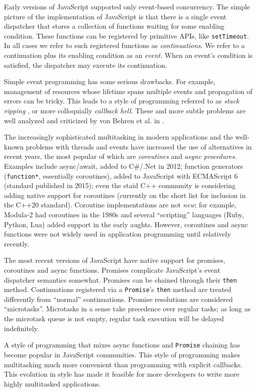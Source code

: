 \documentclass[acmsmall,anonymous,review]{acmart}\settopmatter{printfolios=true,printccs=false,printacmref=false}
\begin{document}
Early versions of JavaScript supported only event-based concurrency.
The simple picture of the implementation of JavaScript is that there is a single event dispatcher that stores a collection of functions waiting for some enabling condition.
These functions can be registered by primitive APIs, like \texttt{setTimeout}.
In all cases we refer to such registered functions as \emph{continuations}.
We refer to a continuation plus its enabling condition as an \emph{event}.
When an event's condition is satisfied, the dispatcher may execute its continuation.

Simple event programming has some serious drawbacks.
For example, management of resources whose lifetime spans multiple events and propagation of errors can be tricky.
This leads to a style of programming referred to as \emph{stack ripping} \cite{Adya2002}, or more colloquially \emph{callback hell}.
These and more subtle problems are well analyzed and criticized by von Behren et al. in \cite{Behren2003a}.

The increasingly sophisticated multitasking in modern applications and the well-known problems with threads and events have increased the use of alternatives in recent years, the most popular of which are \emph{coroutines} and \emph{async procedures}.
Examples include async/await, added to C\#/.Net in 2012; function generators (\texttt{function*}, essentially coroutines), added to JavaScript with ECMAScript 6 (standard published in 2015); even the staid C++ community is considering adding native support for coroutines (currently on the short list for inclusion in the C++20 standard).
Coroutine implementations are not \emph{new}; for example, Modula-2 had coroutines in the 1980s and several ``scripting'' languages (Ruby, Python, Lua) added support in the early aughts.
However, coroutines and async functions were not widely used in application programming until relatively recently.

The most recent versions of JavaScript have native support for promises, coroutines and async functions.
Promises complicate JavaScript's event dispatcher semantics somewhat.
Promises can be chained through their \texttt{then} method.
Continuations registered via a \texttt{Promise}'s \texttt{then} method are treated differently from ``normal'' continuations.
Promise resolutions are considered ``microtasks''.
Microtasks in a sense take precedence over regular tasks; as long as the microtask queue is not empty, regular task execution will be delayed indefinitely.

A style of programming that mixes async functions and \texttt{Promise} chaining has become popular in JavaScript communities.
This style of programming makes multitasking much more convenient than programming with explicit callbacks.
This evolution in style has made it feasible for more developers to write more highly multitasked applications.
\end{document}
